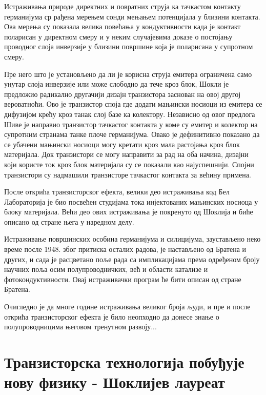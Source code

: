 \documentclass{article}
\begin{document}
Истраживања природе директних и повратних струја ка тачкастом контакту германијума ср рађена мерењем сонди мењањем потенцијала у близини контакта. Ова мерења су показала велика повећања у кондуктивности када је контакт поларисан у директном смеру и у неким случајевима доказе о постојању проводног слоја инверзије у близини површине која је поларисана у супротном смеру.

Пре него што је установљено да ли је корисна струја емитера ограничена само унутар слоја инверзије или може слободно да тече кроз блок, Шокли је предложио радикално другачији дизајн транзистора заснован на овој другој вероватноћи. Ово је транзистор споја где додати мањински носиоци из емитера се дифузијом крећу кроз танак слој базе ка колектору. Независно од овог предлога Шиве је направио транзистор тачкастог контакта у коме су емитер и колектор на супротним странама танке плоче германијума. Овако је дефинитивно показано да се убачени мањински носиоци могу кретати кроз мала растојања кроз блок материјала. Док транзистори се могу направити за рад на оба начина, дизајни који користе ток кроз блок материјала су се показали као најуспешнији. Спојни транзистори су надмашили транзисторе тачкастог контакта за већину примена.

После открића транзисторског ефекта, велики део истраживања код Бел Лабораторија је био посвећен студијама тока инјектованих мањинских носиоца у блоку материјала. Већи део ових истраживања је покренуто од Шоклија и биће описано од стране њега у наредном делу.

Истраживање површинских особина германијума и силицијума, заустављено неко време после 1948. због притиска осталих радова, је настављено од Братена и других, и сада је расцветано поље рада са импликацијама према одређеном броју научних поља осим полупроводничких, већ и области катализе и фотокондуктивности. Овај истраживачки програм ће бити описан од стране Братена.

Очигледно је да многе године истраживања великог броја људи, и пре и после открића транзисторског ефекта је било неопходно да донесе знање о полупроводницима његовом тренутном развоју...


\section{Транзисторска технологија побуђује нову физику - Шоклијев лауреат}
\end{document}
